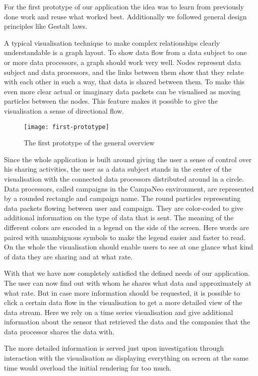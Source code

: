 
For the first prototype of our application the idea was to learn from previously done work and reuse what worked best. Additionally we followed general design principles like Gestalt laws.

A typical visualisation technique to make complex relationships clearly understandable is a graph layout. To show data flow from a data subject to one or more data processors, a graph should work very well.
Nodes represent data subject and data processors, and the links between them show that they relate with each other in such a way, that data is shared between them.
To make this even more clear actual or imaginary data packets can be visualised as moving particles between the nodes.
This feature makes it possible to give the visualisation a sense of directional flow.
\begin{figure}
    \centering
    \texttt{[image: first-prototype]}    \caption{The first prototype of the general overview}
    \label{fig:prototype}
\end{figure}

Since the whole application is built around giving the user a sense of control over his sharing activities, the user as a data subject stands in the center of the visualisation with the connected data processors distributed around in a circle.
Data processors, called campaigns in the CampaNeo environment, are represented by a rounded rectangle and campaign name. The round particles representing data packets flowing between user and campaign. They are color-coded to give additional information on the type of data that is sent.
The meaning of the different colors are encoded in a legend on the side of the screen. Here words are paired with unambiguous symbols to make the legend easier and faster to read.
On the whole the visualisation should enable users to see at one glance what kind of data they are sharing and at what rate.

With that we have now completely satisfied the defined needs of our application.
The user can now find out with whom he shares what data and approximately at what rate.
But in case more information should be requested, it is possible to click a certain data flow in the visualisation to get a more detailed view of the data stream.
Here we rely on a time series visualisation and give additional information about the sensor that retrieved the data and the companies that the data processor shares the data with.

The more detailed information is served just upon investigation through interaction with the visualisation as displaying everything on screen at the same time would overload the initial rendering far too much.

